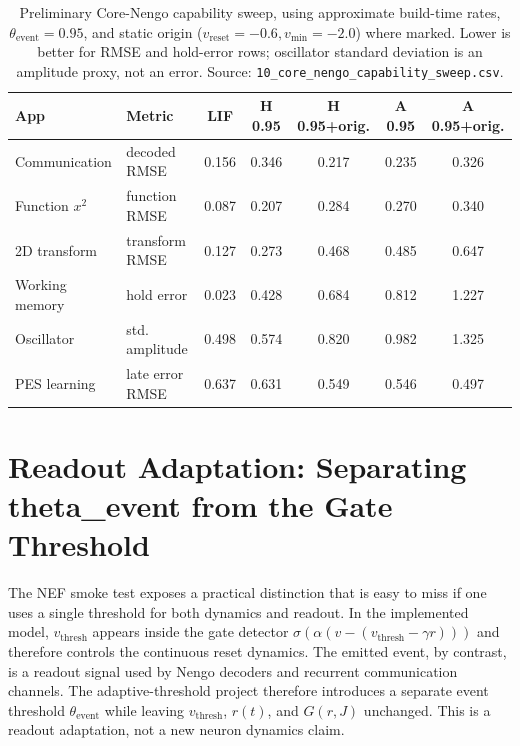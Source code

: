 \documentclass[11pt]{article}
\newcommand{\vth}{v_{\mathrm{thresh}}}
\newcommand{\vre}{v_{\mathrm{reset}}}
\newcommand{\vmin}{v_{\min}}
\newcommand{\thetaevent}{\theta_{\mathrm{event}}}
\newcommand{\code}[1]{\texttt{#1}}
\begin{document}
\begin{table}[t]
  \centering
  \caption{Preliminary Core-Nengo capability sweep, using approximate build-time
  rates, \(\thetaevent=0.95\), and static origin
  (\(\vre=-0.6,\vmin=-2.0\)) where marked. Lower is better for RMSE and
  hold-error rows; oscillator standard deviation is an amplitude proxy, not an
  error. Source: \code{10\_core\_nengo\_capability\_sweep.csv}.}
  \label{tab:capability-sweep}
  \small
  \begin{tabular}{llccccc}
    \toprule
    App & Metric & LIF & H 0.95 & H 0.95+orig. & A 0.95 & A 0.95+orig. \\
    \midrule
    Communication & decoded RMSE & 0.156 & 0.346 & 0.217 & 0.235 & 0.326 \\
    Function \(x^2\) & function RMSE & 0.087 & 0.207 & 0.284 & 0.270 & 0.340 \\
    2D transform & transform RMSE & 0.127 & 0.273 & 0.468 & 0.485 & 0.647 \\
    Working memory & hold error & 0.023 & 0.428 & 0.684 & 0.812 & 1.227 \\
    Oscillator & std. amplitude & 0.498 & 0.574 & 0.820 & 0.982 & 1.325 \\
    PES learning & late error RMSE & 0.637 & 0.631 & 0.549 & 0.546 & 0.497 \\
    \bottomrule
  \end{tabular}
\end{table}

\section{Readout Adaptation: Separating theta\_event from the Gate Threshold}
\label{sec:thetaevent}
The NEF smoke test exposes a practical distinction that is easy to miss if one
uses a single threshold for both dynamics and readout. In the implemented model,
\(\vth\) appears inside the gate detector
\(\sigma(\alpha(v-(\vth-\gamma r)))\) and therefore controls the continuous
reset dynamics. The emitted event, by contrast, is a readout signal used by
Nengo decoders and recurrent communication channels. The adaptive-threshold
project therefore introduces a separate event threshold
\(\thetaevent\) while leaving \(\vth\), \(r(t)\), and \(G(r,J)\) unchanged.
This is a readout adaptation, not a new neuron dynamics claim.
\end{document}
